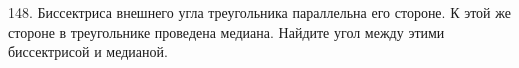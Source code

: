148. Биссектриса внешнего угла треугольника параллельна его стороне. К этой же стороне в треугольнике проведена медиана. Найдите угол между этими биссектрисой и медианой.\\
